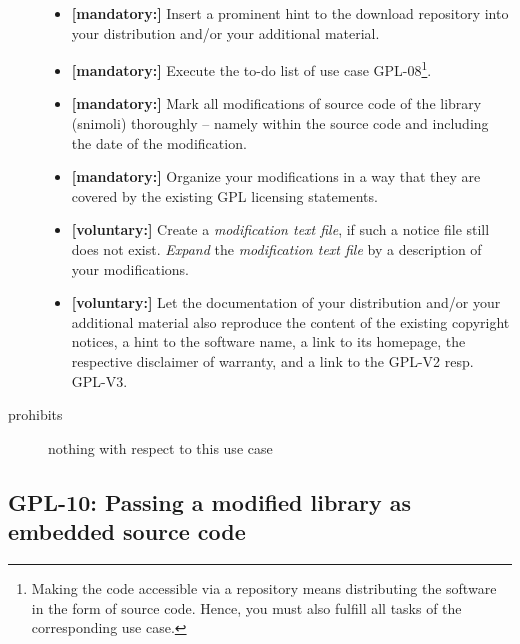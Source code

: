 \begin{description}
\begin{itemize}
  \item \textbf{[mandatory:]} Insert a prominent hint to the download repository
  into your distribution and/or your additional material.
  
  \item \textbf{[mandatory:]} Execute the to-do list of use case GPL-08\footnote{
  Making the code accessible via a repository means distributing the software in
  the form of source code. Hence, you must also fulfill all tasks of the
  corresponding use case.}.

  \item \textbf{[mandatory:]} Mark all modifications of source code of the
  library (snimoli) thoroughly -- namely within the source code and including
  the date of the modification.

  \item \textbf{[mandatory:]} Organize your modifications in a way that they are
  covered by the existing GPL licensing statements.
    
  \item \textbf{[voluntary:]} Create a \emph{modification text file}, if such a
  notice file still does not exist. \emph{Expand} the \emph{modification text
  file} by a description of your modifications.

  \item \textbf{[voluntary:]} Let the documentation of your distribution and/or
  your additional material also reproduce the content of the existing
  copyright notices, a hint to the software name, a link to its homepage,
  the respective disclaimer of warranty, and a link to the GPL-V2 resp.
  GPL-V3.
  
\end{itemize}

\item[prohibits] nothing with respect to this use case
\end{description}

\subsection{GPL-10: Passing a modified library as embedded source code}
\label{OSUC-10S-GPL}

